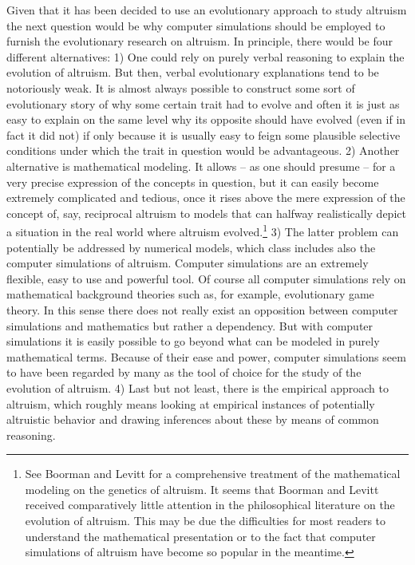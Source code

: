 Given that it has been decided to use an evolutionary approach to study
altruism the next question would be why computer simulations should be
employed to furnish the evolutionary research on altruism.  In principle,
there would be four different alternatives: 1) One could rely on purely verbal
reasoning to explain the evolution of altruism.  But then, verbal evolutionary
explanations tend to be notoriously weak. It is almost always possible to
construct some sort of evolutionary story of why some certain trait had to
evolve and often it is just as easy to explain on the same level why its
opposite should have evolved (even if in fact it did not) if only because it
is usually easy to feign some plausible selective conditions under which the
trait in question would be advantageous. 2) Another alternative is
mathematical modeling. It allows -- as one should presume -- for a very
precise expression of the concepts in question, but it can easily become
extremely complicated and tedious, once it rises above the mere expression of
the concept of, say, reciprocal altruism to models that can halfway
realistically depict a situation in the real world where altruism
evolved.\footnote{See Boorman and Levitt \cite[]{boorman-levitt:1980} for a
  comprehensive treatment of the mathematical modeling on the genetics of
  altruism. It seems that Boorman and Levitt received comparatively little
  attention in the philosophical literature on the evolution of altruism. 
  This may be due the difficulties for most readers to understand
  the mathematical presentation or to the fact that computer simulations of
  altruism have become so popular in the meantime.} 3) The latter problem can
potentially be addressed by numerical models, which class includes also the
computer simulations of altruism. Computer simulations are an extremely
flexible, easy to use and powerful tool. Of course all computer simulations
rely on mathematical background theories such as, for example, evolutionary
game theory. In this sense there does not really exist an opposition between
computer simulations and mathematics but rather a dependency. But with
computer simulations it is easily possible to go beyond what can be modeled
in purely mathematical terms.
Because of their ease and power, computer simulations seem to have been
regarded by many as the tool of choice for the study of the evolution of altruism.
4) Last but not least, there is the empirical approach to altruism, which roughly means
looking at empirical instances of potentially altruistic behavior and drawing
inferences about these by means of common reasoning.

